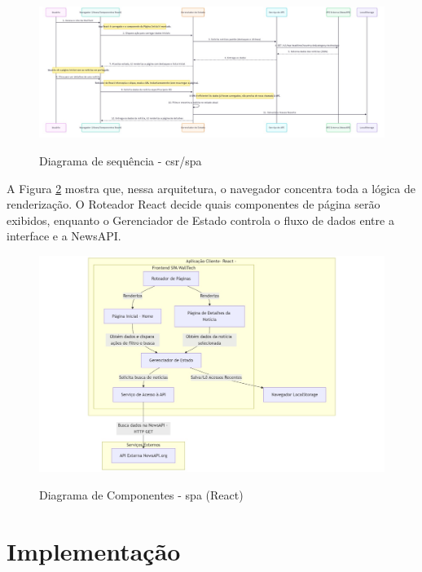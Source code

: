 \begin{figure}[H]
  \centering
  \caption{Diagrama de sequência - \acrshort{csr}/\acrshort{spa}}
  \includegraphics[width=1\textwidth]{media/wall_tech_detail_sequence_diagram.jpeg}
  \label{fig:sequence-diagram-csr}
\end{figure}


A Figura \ref{fig:component-diagram-react} mostra que, nessa arquitetura, o navegador concentra toda a lógica de renderização. O Roteador React decide quais componentes de página serão exibidos, enquanto o Gerenciador de Estado controla o fluxo de dados entre a interface e a NewsAPI.

\begin{figure}[H]
  \centering
  \caption{Diagrama de Componentes - \acrshort{spa} (React)}
  \includegraphics[width=1\textwidth]{media/component-diagram-react.jpeg}
  \label{fig:component-diagram-react}
\end{figure}



\section{Implementação}
\label{sec:implementacao}

